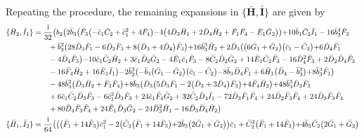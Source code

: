 \documentclass[10pt]{amsart}
\theoremstyle{definition}
\theoremstyle{corollary}
\theoremstyle{remark}
\theoremstyle{conclusion}
\begin{document}
Repeating the procedure, the remaining expansions in $\{\bar{\textbf{H}},\bar{\textbf{I}}\}$ are given by 
\begin{align} 
\{\bar{H}_2, \bar{I}_1\}&=\frac{{\rm i}}{32} \bigl(b_2 \bigl(2 \bar{b}_3 \bigl(\bar{F}_3 \bigl(-\bar{c}_1 \bar{C}_2+\bar{c}_1^2+4 \bar{F}_4\bigl)-4 \bigl(4 \bar{D}_3 \bar{H}_1+2 \bar{D}_4 \bar{H}_2+\bar{F}_1 \bar{F}_4-\bar{E}_1 \bar{G}_2\bigl)\bigl)+10 \bar{b}_1 \bar{C}_2 \bar{I}_1-16 \bar{b}_3^4 \bar{F}_3\nonumber \\
& \hskip 0.7cm+\bar{b}_3^2 \bigl(28 \bar{D}_3 \bar{F}_1-6 \bar{D}_2 \bar{F}_3+8 \bigl(\bar{D}_3+4 \bar{D}_4\bigl) \bar{F}_3\bigl)+16 \bar{b}_3^3 \bar{H}_2+2 \bar{D}_3 \bigl(\bigl(6 \bar{G}_1+\bar{G}_2\bigl) \bigl(\bar{c}_1-\bar{C}_2\bigl)+6 \bar{D}_4 \bar{F}_1\nonumber \\
& \hskip 0.7cm-4 \bar{D}_4 \bar{F}_3\bigl)-10 \bar{c}_1 \bar{C}_2 \bar{H}_2+3 \bar{c}_1 \bar{D}_2 \bar{G}_2-4 \bar{E}_1 \bar{c}_1 \bar{F}_3-8 \bar{C}_2 \bar{D}_2 \bar{G}_2+14 \bar{E}_1 \bar{C}_2 \bar{F}_3-16 \bar{D}_4^2 \bar{F}_3+2 \bar{D}_2 \bar{D}_4 \bar{F}_3\nonumber \\
& \hskip 0.7cm-16 \bar{F}_4 \bar{H}_2+16 \bar{E}_1 \bar{I}_1\bigl)-2 \bar{b}_2^2 \bigl(-\bar{b}_3 \bigl(\bar{G}_1-\bar{G}_2\bigl) \bigl(\bar{c}_1-\bar{C}_2\bigl)-8 \bar{b}_3 \bar{D}_4 \bar{F}_1+6 \bar{H}_1 \bigl(\bar{D}_4-\bar{b}_3^2\bigl)+8 \bar{b}_3^3 \bar{F}_1\bigl)\nonumber \\
& \hskip 0.7cm-48 \bar{b}_3^2 \bigl(\bar{D}_3 \bar{H}_2+\bar{F}_3 \bar{F}_4\bigl)+8 \bar{b}_3 \bigl(\bar{D}_3 \bigl(5 \bar{D}_3 \bar{F}_1-2 \bigl(\bar{D}_3+3 \bar{D}_4\bigl) \bar{F}_3\bigl)+4 \bar{F}_4 \bar{H}_2\bigl)+48 \bar{b}_3^3 \bar{D}_3 \bar{F}_3\nonumber \\
& \hskip 0.7cm+6 \bar{c}_1 \bar{C}_2 \bar{D}_3 \bar{F}_3-6 \bar{c}_1^2 \bar{D}_3 \bar{F}_3+24 \bar{c}_1 \bar{F}_4 \bar{G}_2+32 \bar{C}_2 \bar{D}_4 \bar{I}_1-72 \bar{D}_3 \bar{F}_1 \bar{F}_4+24 \bar{D}_2 \bar{F}_3 \bar{F}_4+24 \bar{D}_3 \bar{F}_3 \bar{F}_4\nonumber \\
& \hskip 0.7cm+80 \bar{D}_4 \bar{F}_3 \bar{F}_4+24 \bar{E}_1 \bar{D}_3 \bar{G}_2-24 \bar{D}_3^2 \bar{H}_1-16 \bar{D}_3 \bar{D}_4 \bar{H}_2\bigl) \,   \\
\{\bar{H}_1, \bar{I}_2\}&=\frac{{\rm i}}{64}  \bigl(\bigl(\bigl(\bar{F}_1+14 \bar{F}_3\bigl) \bar{c}_1^2-2 \bigl(\bar{C}_2 \bigl(\bar{F}_1+14 \bar{F}_3\bigl)+2 \bar{b}_3 \bigl(2 \bar{G}_1+\bar{G}_2\bigl)\bigl) \bar{c}_1+\bar{C}_2^2 \bigl(\bar{F}_1+14 \bar{F}_3\bigl)+4 \bar{b}_3 \bar{C}_2 \bigl(2 \bar{G}_1+\bar{G}_2\bigl)\nonumber \\

\end{align}
\end{document}

